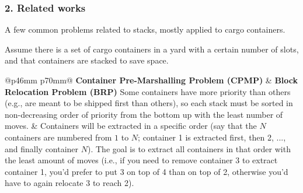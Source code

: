 \documentclass{beamer}
\def\\{}
\begin{document}
\begin{frame}
\frametitle{2. Related works}

A few common problems related to stacks, mostly applied to cargo containers.

Assume there is a set of cargo containers in a yard with a certain number of slots, and that containers are stacked to save space.

\vspace{0.5em}

\begin{tabular}{@{}p{46mm} p{70mm}@{}}
  \textbf{Container Pre-Marshalling Problem (CPMP)} & \textbf{Block Relocation Problem (BRP)} \\
  Some containers have more priority than others (e.g., are meant to be shipped first than others), so each stack must be sorted in non-decreasing order of priority from the bottom up with the least number of moves. &
  Containers will be extracted in a specific order (say that the $N$ containers are numbered from $1$ to $N$; container 1 is extracted first, then 2, ..., and finally container $N$). The goal is to extract all containers in that order with the least amount of moves (i.e., if you need to remove container 3 to extract container 1, you'd prefer to put 3 on top of 4 than on top of 2, otherwise you'd have to again relocate 3 to reach 2).
\end{tabular}

\end{frame}
\end{document}
